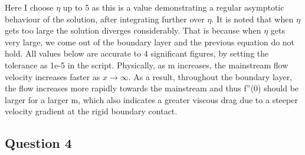 \documentclass[a4paper,11pt]{article}
\begin{document}
Here I choose $\eta$ up to 5 as this is a value demonstrating a regular asymptotic behaviour of the solution, after integrating further over $\eta$. It is noted that when $\eta$ gets too large the solution diverges considerably. That is because when $\eta$ gets very large, we come out of the boundary layer and the previous equation do not hold.  All values below are accurate to 4 significant figures, by setting the tolerance as 1e-5 in the script. Physically, as m increases, the mainstream flow velocity increases faster as $x \to \infty$. As a result, throughout the boundary layer, the flow increases more rapidly towards the mainstream and thus f''(0) should be larger for a larger m, which also indicates a greater viscous drag due to a steeper velocity gradient at the rigid boundary contact.

\subsection{Question 4}
\end{document}
